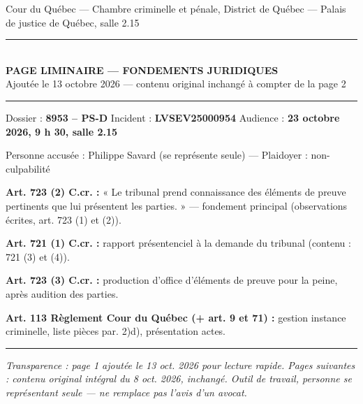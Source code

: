 \documentclass[12pt,letterpaper,oneside]{article}
\begin{document}
\thispagestyle{empty}
{\singlespacing
\begin{center}
{\footnotesize Cour du Québec — Chambre criminelle et pénale, District de Québec — Palais de justice de Québec, salle 2.15\par}
\vspace{0.1cm}
\rule{\textwidth}{0.4pt}\\[0.2em]
{\large\bfseries PAGE LIMINAIRE — FONDEMENTS JURIDIQUES}\\[0.1em]
{\footnotesize Ajoutée le 13 octobre 2026 — contenu original inchangé à compter de la page 2}\\[0.15em]
\rule{\textwidth}{0.4pt}
\end{center}
\begin{center}
{\footnotesize Dossier : \textbf{8953 – PS-D} \quad Incident : \textbf{LVSEV25000954} \quad Audience : \textbf{23 octobre 2026, 9 h 30, salle 2.15}\par}
{\footnotesize Personne accusée : Philippe Savard (se représente seule) — Plaidoyer : non-culpabilité\par}
\end{center}
\vspace{0.1cm}
\noindent{}
\vspace{0.15cm}
\begin{enumerate}[label=\arabic*.,leftmargin=*,itemsep=1pt,topsep=1pt,parsep=0pt]
{\small
\item \textbf{Art. 723 (2) C.cr. :} « Le tribunal prend connaissance des éléments de preuve pertinents que lui présentent les parties. » — fondement principal (observations écrites, art. 723 (1) et (2)).
\item \textbf{Art. 721 (1) C.cr. :} rapport présentenciel à la demande du tribunal (contenu : 721 (3) et (4)).
\item \textbf{Art. 723 (3) C.cr. :} production d'office d'éléments de preuve pour la peine, après audition des parties.
\item \textbf{Art. 113 Règlement Cour du Québec (+ art. 9 et 71) :} gestion instance criminelle, liste pièces par. 2)d), présentation actes.
}
\end{enumerate}
\vspace{0.05cm}
\rule{\textwidth}{0.4pt}
{\footnotesize\emph{Transparence : page 1 ajoutée le 13 oct. 2026 pour lecture rapide. Pages suivantes : contenu original intégral du 8 oct. 2026, inchangé. Outil de travail, personne se représentant seule — ne remplace pas l'avis d'un avocat.}}
\par}
\newpage
\end{document}

